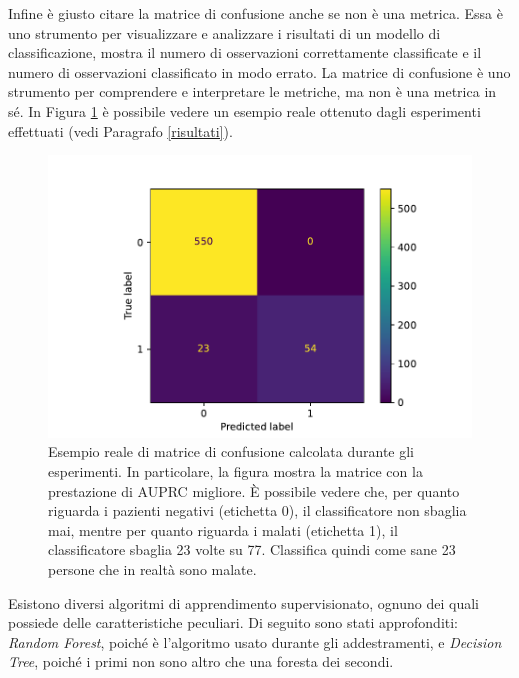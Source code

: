 \documentclass[12pt,italian]{report}
\begin{document}
	Infine è giusto citare la matrice di confusione anche se non è una metrica. Essa è uno strumento per visualizzare e analizzare i risultati di un modello di classificazione, mostra il numero di osservazioni correttamente classificate e il numero di osservazioni classificato in modo errato. La matrice di confusione è uno strumento per comprendere e interpretare le metriche, ma non è una metrica in sé.
	In Figura \ref{fig:mirnaconfusionmatrixtotalexample} è possibile vedere un esempio reale ottenuto dagli esperimenti effettuati (vedi Paragrafo \ref{risultati}).
	
	\begin{figure}
		\centering
		\includegraphics[width=0.7\linewidth]{immagini/mirna_ConfusionMatrixTotalExample}
		\caption{Esempio reale di matrice di confusione calcolata durante gli esperimenti. In particolare, la figura mostra la matrice con la prestazione di AUPRC migliore. È possibile vedere che, per quanto riguarda i pazienti negativi (etichetta 0), il classificatore non sbaglia mai, mentre per quanto riguarda i malati (etichetta 1), il classificatore sbaglia 23 volte su 77. Classifica quindi come sane 23 persone che in realtà sono malate.}
		\label{fig:mirnaconfusionmatrixtotalexample}
	\end{figure}
		
	Esistono diversi algoritmi di apprendimento supervisionato, ognuno dei quali possiede delle caratteristiche peculiari. Di seguito sono stati approfonditi: \textit{Random Forest}, poiché è l'algoritmo usato durante gli addestramenti, e \textit{Decision Tree}, poiché i primi non sono altro che una foresta dei secondi.
	
\end{document}
